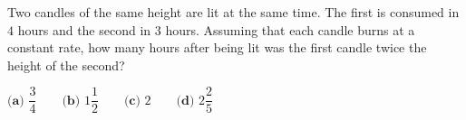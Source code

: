 Two candles of the same height are lit at the same time. The first is consumed in $4$ hours and the second in $3$ hours. Assuming that each candle burns at a constant rate, how many hours after being lit was the first candle twice the height of the second?

$\textbf{(a) }\dfrac{3}{4}\qquad\textbf{(b) }1\dfrac{1}{2}\qquad\textbf{(c) }2\qquad\textbf{(d) }2\dfrac{2}{5}$
